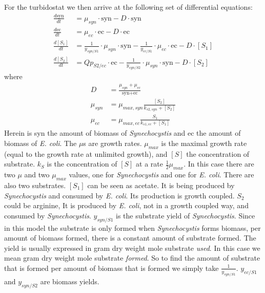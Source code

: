\documentclass[12pt]{report}
\begin{document}
For the turbidostat we then arrive at the following set of differential equations:
\begin{align} \label{eq:turb}
 \frac{d\text{syn}}{dt} &= \mu_{syn}\cdot\text{syn} - D\cdot\text{syn}\\
 \frac{d\text{ec}}{dt} &= \mu_{ec}\cdot\text{ec} - D\cdot\text{ec} \\
 \frac{d[S_1]}{dt} &= \frac{1}{y_{syn/S1}}\cdot \mu_{syn}\cdot \text{syn} - \frac{1}{y_{ec/S1}}\cdot \mu_{ec}\cdot \text{ec} -D\cdot[S_1]\\
 \frac{d[S_2]}{dt} &=  Qp_{S2/ec}\cdot\text{ec} - \frac{1}{y_{syn/S2}}\cdot \mu_{syn}\cdot \text{syn} -D\cdot[S_2]
\end{align}
where
\begin{align}
 D &= \frac{\mu_{syn} + \mu_{ec}}{\text{syn}+\text{ec}}\\
 \mu_{syn} &= \mu_{max,syn} \frac{[S_2]}{k_{s2,syn}+[S_{2}]}\\
 \mu_{ec} &= \mu_{max,ec} \frac{S_1}{k_{s1,ec}+[S_1]} \label{eq:turbend}
\end{align}
Herein is syn the amount of biomass of \textit{Synechocystis} and ec the amount of biomass of \textit{E. coli}. 
The $\mu$s are growth rates.
$\mu_{max}$ is the maximal growth rate (equal to the growth rate at unlimited growth), and $[S]$ the concentration of substrate. $k_S$ is the concentration of $[S]$ at a rate $\frac{1}{2}\mu_{max}$. In this case there are two $\mu$ and two $\mu_{max}$ values, one for \textit{Synechocystis} and one for \textit{E. coli}. There are also two substrates. $[S_1]$ can be seen as acetate. It is being produced by \textit{Synechocystis} and consumed by \textit{E. coli}. Its production is growth coupled. $S_2$ could be arginine, It is produced by \textit{E. coli}, not in a growth coupled way, and consumed by \textit{Synechocystis}.
$y_{syn/S1}$ is the substrate yield of \textit{Synechocystis}. Since in this model the substrate is only formed when \textit{Synechocystis} forms biomass, per amount of biomass formed, there is a constant amount of substrate formed. The yield is usually expressed in gram dry weight mole substrate \emph{used}. In this case we mean gram dry weight mole substrate \emph{formed}. So to find the amount of substrate that is formed per amount of biomass that is formed we simply take $\frac{1}{y_{syn/S1}}$. $y_{ec/S1}$ and $y_{syn/S2}$ are biomass yields.
\end{document}

